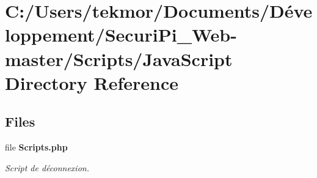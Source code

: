 \section{C\+:/\+Users/tekmor/\+Documents/\+Développement/\+Securi\+Pi\+\_\+\+Web-\/master/\+Scripts/\+Java\+Script Directory Reference}
\label{dir_931977847f1cc0acd1255d299e7b4d6c}
\subsection*{Files}
\begin{DoxyCompactItemize}
\item 
file {\bf Scripts.\+php}
\begin{DoxyCompactList}\small\item\em Script de d\'{e}connexion. \end{DoxyCompactList}\end{DoxyCompactItemize}
